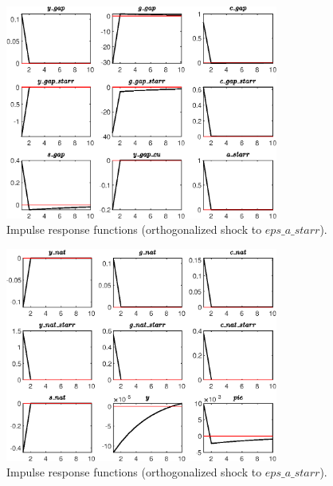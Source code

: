 
\begin{figure}[H]
\centering 
\includegraphics[width=0.80\textwidth]{MODEL_MAIN/graphs/MODEL_MAIN_IRF_eps_a_starr1}
\caption{Impulse response functions (orthogonalized shock to $eps\_a\_starr$).}\label{Fig:IRF:eps_a_starr:1}
\end{figure}
 
\begin{figure}[H]
\centering 
\includegraphics[width=0.80\textwidth]{MODEL_MAIN/graphs/MODEL_MAIN_IRF_eps_a_starr2}
\caption{Impulse response functions (orthogonalized shock to $eps\_a\_starr$).}\label{Fig:IRF:eps_a_starr:2}
\end{figure}
 
